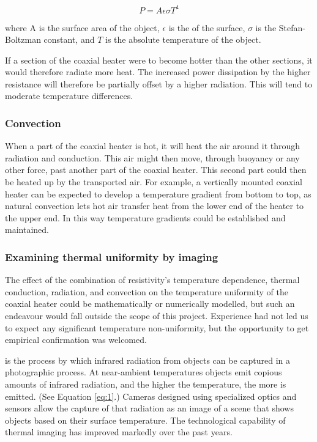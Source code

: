\begin{equation}\label{eq:1}
	P=A \epsilon \sigma T^4
\end{equation}

where A is the surface area of the object, \(\epsilon\) is the
 of the surface, \(\sigma\) is the Stefan-Boltzman constant,
and \(T\) is the absolute temperature of the object. 

If a section of the coaxial heater were to become hotter than the other
sections, it would therefore radiate more heat. The increased power dissipation
by the higher resistance will therefore be partially offset by a higher
radiation. This will tend to moderate temperature differences.

\subsubsection{Convection}

When a part of the coaxial heater is hot, it will heat the air around it through
radiation and conduction. This air might then move, through buoyancy or any
other force, past another part of the coaxial heater. This second part could
then be heated up by the transported air. For example, a vertically mounted
coaxial heater can be expected to develop a temperature gradient from bottom to
top, as natural convection lets hot air transfer heat from the lower end of the
heater to the upper end. In this way temperature gradients could be established
and maintained.

\subsubsection{Examining thermal uniformity by imaging}

The effect of the combination of resistivity's temperature dependence, thermal
conduction, radiation, and convection on the temperature uniformity of the
coaxial heater could be mathematically or numerically modelled, but such an
endeavour would fall outside the scope of this project. Experience had not led
us to expect any significant temperature non-uniformity, but the
opportunity to get empirical confirmation was welcomed.

 is the process by which infrared radiation from
objects can be captured in a photographic process. At near-ambient temperatures
objects emit copious amounts of infrared radiation, and the higher the
temperature, the more is emitted. (See Equation \ref{eq:1}.) Cameras designed
using specialized optics and sensors allow the capture of that radiation as an
image of a scene that shows objects based on their surface temperature. The
technological capability of thermal imaging has improved markedly over the past
years.

